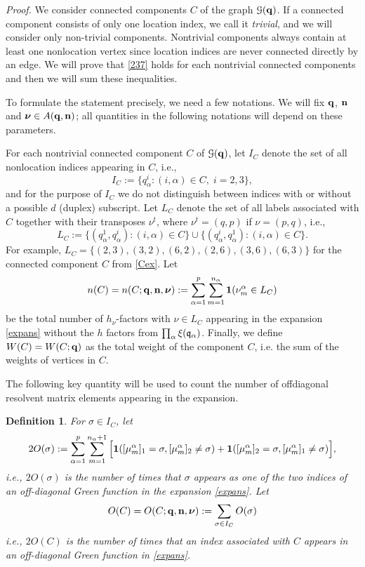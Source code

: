 \documentclass[draft]{article}
\newcommand{\bq}{{\bf {q}}}
\newcommand{\bn}{{\bf{n}}}
\newcommand{\fq}{{\frak q}}
\newcommand{\bnu}{\mbox{\boldmath $\nu$}}
\newcommand{\al}{\alpha}
\newcommand{\be}{\begin{equation}}
\newcommand{\ee}{\end{equation}}
\newcommand{\cG}{{\mathcal G}}
\newtheorem{definition}{Definition}
\numberwithin{equation}{section}
\numberwithin{theorem}{section}
\numberwithin{definition}{section}
\numberwithin{remark}{section}
\begin{document}
{\it Proof.} We consider connected components $C$ of the graph $\cG(\bq)$.
If a connected component consists of
 only one location index, we call it {\it trivial}, and we
 will consider only non-trivial components. Nontrivial components
always contain at least one nonlocation vertex since location indices
are never connected directly by an edge. 
We will prove that \eqref{237} holds for each nontrivial connected components
and then we will sum these inequalities. 

To formulate the statement
precisely, we need a few notations. We will fix
 $\bq$, $\bn$ and $\bnu\in A(\bq,\bn)$;
all quantities in the following notations will depend on these parameters.


For each nontrivial connected component $C$ of $\cG(\bq)$, let $I_C$ denote 
the set of all nonlocation indices   appearing in $C$, i.e., 
\be
I_C := \{ q^i_\alpha:  (i, \al) \in C, \; i=2,3 \},
\ee
and for the purpose of $I_C$ we do not distinguish between
indices with or without 
a possible $d$ (duplex) subscript.
Let $L_C$ denote the set 
of all labels associated with  $C$ together 
with their transposes $\nu^t$, where  $ \nu^t = (q, p)$ if $\nu=(p, q)$, i.e., 
\be
L_C := \{ ( q^1_\alpha,  q^i_\alpha): (i, \alpha) \in C\} 
\cup \{ ( q^i_\alpha,  q^1_\alpha): (i, \alpha) \in C\}.
\ee
For example, $ L_C = \{
(2,3 ), (3,2), (6,2), (2,6), (3,6), (6,3) \} $
for  the connected component
$C$ from \eqref{Cex}.
Let 
$$
  n(C)= n(C; \bq, \bn, \bnu):
 = \sum_{\al=1}^p \sum_{m=1}^{n_\al} {\bf 1}( \nu_m^\al \in L_C)
$$
be the total number of $h_\nu$-factors 
with $\nu\in L_C$ appearing in the expansion \eqref{expans}
without the $h$ factors from $\prod_\al \xi(\fq_\al)$.
Finally,  we define $W(C)= W(C; \bq)$ as the total weight of the component $C$,
i.e. the sum of the weights of vertices in $C$.


The following key quantity will be used to count the number of offdiagonal
resolvent matrix elements appearing in the expansion.


\begin{definition}
For $\sigma\in I_C$, let  
$$
  2O(\sigma) := \sum_{\al=1}^p \sum_{m=1}^{n_\al+1}\Big[ {\bf 1}( [\mu_m^\al]_1 
=\sigma,  [\mu_m^\al]_2 \ne\sigma) + {\bf 1}( [\mu_m^\al]_2 
=\sigma,  [\mu_m^\al]_1 \ne\sigma) \Big],
$$
i.e., $2O(\sigma)$ is the number
 of times that $\sigma$   appears as one of the two indices of an
off-diagonal Green function
in the expansion \eqref{expans}.
 Let
\be
O(C) = O(C; \bq,\bn, \bnu): = \sum_{\sigma \in I_C} O(\sigma) 
\ee  
i.e., $2O(C)$ is the number of times that an index associated with $C$ appears
in an off-diagonal Green function in \eqref{expans}.
\end{definition} 
\end{document}
